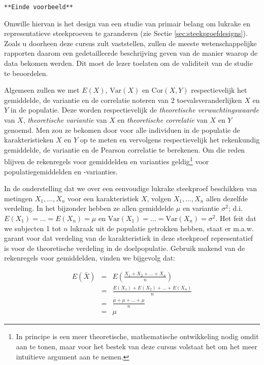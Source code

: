 \documentclass[12pt,dutch,coursenotes]{book}
\let\rmarkdownfootnote\footnote%
\def\footnote{\protect\rmarkdownfootnote}
\theoremstyle{definition}
\theoremstyle{definition}
\theoremstyle{definition}
\theoremstyle{remark}
\begin{document}
\texttt{**Einde\ voorbeeld**}

Omwille hiervan is het design van een studie van primair belang om
lukrake en representatieve steekproeven te garanderen (zie Sectie
\ref{sec:steekproefdesigns}). Zoals u doorheen deze cursus zult
vaststellen, zullen de meeste wetenschappelijke rapporten daarom een
gedetailleerde beschrijving geven van de manier waarop de data bekomen
werden. Dit moet de lezer toelaten om de validiteit van de studie te
beoordelen.

Algemeen zullen we met \(E(X)\), \(\text{Var}(X)\) en
\(\text{Cor}(X,Y)\) respectievelijk het gemiddelde, de variantie en de
correlatie noteren van 2 toevalsveranderlijken \(X\) en \(Y\) in de
populatie. Deze worden respectievelijk de \emph{theoretische
verwachtingswaarde} van \(X\), \emph{theoretische variantie} van \(X\)
en \emph{theoretische correlatie} van \(X\) en \(Y\) genoemd. Men zou ze
bekomen door voor alle individuen in de populatie de karakteristieken
\(X\) en \(Y\) op te meten en vervolgens respectievelijk het rekenkundig
gemiddelde, de variantie en de Pearson correlatie te berekenen. Om die
reden blijven de rekenregels voor gemiddelden en varianties
geldig\footnote{In principe is een meer theoretische, mathematische
  ontwikkeling nodig omdit aan te tonen, maar voor het bestek van deze
  cursus volstaat het om het meer intuïtieve argument aan te nemen.}
voor populatiegemiddelden en -varianties.

In de onderstelling dat we over een eenvoudige lukrake steekproef
beschikken van metingen \(X_1,...,X_n\) voor een karakteristiek \(X\),
volgen \(X_1,...,X_n\) allen dezelfde verdeling. In het bijzonder hebben
ze allen gemiddelde \(\mu\) en variantie \(\sigma^2\); d.i.
\(E(X_1)=...=E(X_n)=\mu\) en
\(\text{Var}(X_1)=...=\text{Var}(X_n)=\sigma^2\). Het feit dat we
subjecten 1 tot \(n\) lukraak uit de populatie getrokken hebben, staat
er m.a.w. garant voor dat verdeling van de karakteristiek in deze
steekproef representatief is voor de theoretische verdeling in de
doelpopulatie. Gebruik makend van de rekenregels voor gemiddelden,
vinden we bijgevolg dat:

\begin{eqnarray*}
E(\bar X) &=& E \left(\frac{X_1+ X_2+ ... + X_n}{n}\right) \\
&= & \frac{E(X_1)+ E(X_2)+ ... + E(X_n)}{n} \\
&=& \frac{\mu + \mu + ... +\mu}{n} \\
&= & \mu
\end{eqnarray*}
\end{document}
